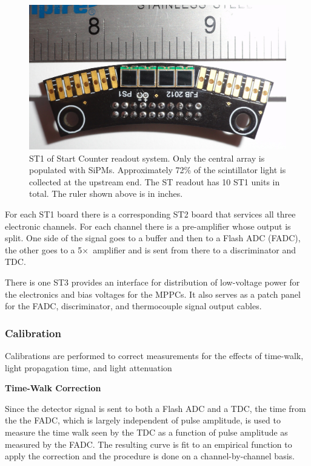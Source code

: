 \begin{figure}[!htb]
  \centering
  \includegraphics[width=1.0\columnwidth]{figures/st1_ruler}
  \caption{ST1 of Start Counter readout system.  Only the central array 
    is populated with SiPMs.  Approximately 72\% of the scintillator light 
    is collected at the upstream end.  The ST readout has 10 ST1 units in 
    total.  The ruler shown above is in inches.}
  \label{fig:st-ST1}
\end{figure}

For each ST1 board there is a corresponding ST2 board that services
all three electronic channels. For each channel there is a
pre-amplifier whose output is split. One side of the signal goes to a
buffer and then to a Flash ADC (FADC), the other goes to a
5$\times$~amplifier and is sent from there to a discriminator and TDC.

There is one ST3 provides an interface for distribution of low-voltage
power for the electronics and bias voltages for the MPPCs. It also
serves as a patch panel for the FADC, discriminator, and thermocouple
signal output cables.

\subsubsection{Calibration}

Calibrations are performed to correct measurements for the effects of
time-walk, light propagation time, and light attenuation

{\bf Time-Walk Correction}

Since the detector signal is sent to both a Flash ADC and a TDC, the time from the the FADC, which is largely independent of pulse amplitude, is used to measure the time walk seen by the TDC as a function of pulse amplitude as measured by the FADC. The resulting curve is fit to an empirical function to apply the correction and the procedure is done on a channel-by-channel basis.


